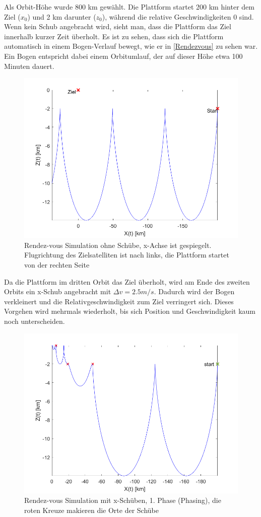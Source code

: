 \documentclass{article}
\begin{document}
Als Orbit-Höhe wurde 800 km gewählt. Die Plattform startet 200 km hinter dem Ziel ($x_0$) und 2 km darunter ($z_0$), während die relative Geschwindigkeiten 0 sind. Wenn kein Schub angebracht wird, sieht man, dass die Plattform das Ziel innerhalb kurzer Zeit überholt. Es ist zu sehen, dass sich die Plattform automatisch in einem Bogen-Verlauf bewegt, wie er in \autoref{Rendezvous} zu sehen war. Ein Bogen entspricht dabei einem Orbitumlauf, der auf dieser Höhe etwa 100 Minuten dauert.
\begin{figure}[H]
	\centering
	\includegraphics[width=0.6\linewidth]{bilder/Phasing.png}
	\caption{Rendez-vous Simulation ohne Schübe, x-Achse ist gespiegelt. Flugrichtung des Zielsatelliten ist nach links, die Plattform startet von der rechten Seite}
	\label{Phasing}
\end{figure}
\noindent Da die Plattform im dritten Orbit das Ziel überholt, wird am Ende des zweiten Orbits ein x-Schub angebracht mit $\Delta v = 2.5 m/s$. Dadurch wird der Bogen verkleinert und die Relativgeschwindigkeit zum Ziel verringert sich. Dieses Vorgehen wird mehrmals wiederholt, bis sich Position und Geschwindigkeit kaum noch unterscheiden.
\begin{figure}[H]
	\centering
	\includegraphics[width=0.6\linewidth]{bilder/RendezvousPhase1A.png}
	\caption{Rendez-vous Simulation mit x-Schüben, 1. Phase (Phasing), die roten Kreuze makieren die Orte der Schübe}
	\label{Phasing}
\end{figure}
\end{document}

